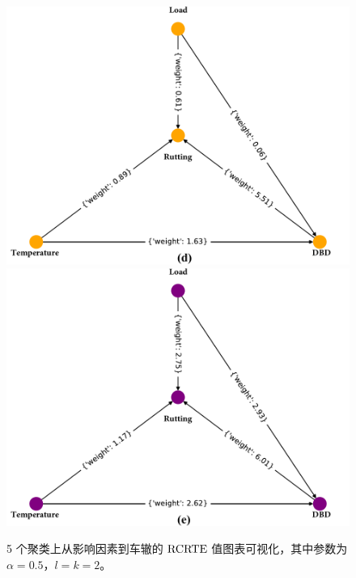\begin{figure}[htbp]
\begin{center}
\includegraphics[scale=0.3]{./ch2/fig2_14.pdf}
\includegraphics[scale=0.3]{./ch2/fig2_15.pdf}
\caption{5 个聚类上从影响因素到车辙的 $\rm{RCRTE}$ 值图表可视化，其中参数为 $\alpha=0.5$，$l=k=2$。} \label{fig7}
\end{center}
\end{figure}

